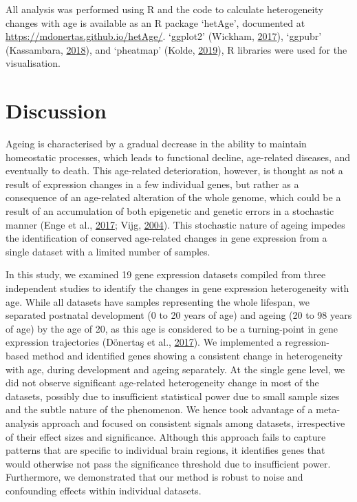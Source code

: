 \documentclass[12pt,twoside]{unicam}
\begin{document}
All analysis was performed using R and the code to calculate heterogeneity changes with age is available as an R package `hetAge', documented at \url{https://mdonertas.github.io/hetAge/}. `ggplot2' (Wickham, \protect\hyperlink{ref-Wickham2017}{2017}), `ggpubr' (Kassambara, \protect\hyperlink{ref-Kassambara2018}{2018}), and `pheatmap' (Kolde, \protect\hyperlink{ref-Kolde2019}{2019}), R libraries were used for the visualisation.

\hypertarget{discussion}{%
\section{Discussion}\label{discussion}}

Ageing is characterised by a gradual decrease in the ability to maintain homeostatic processes, which leads to functional decline, age-related diseases, and eventually to death. This age-related deterioration, however, is thought as not a result of expression changes in a few individual genes, but rather as a consequence of an age-related alteration of the whole genome, which could be a result of an accumulation of both epigenetic and genetic errors in a stochastic manner (Enge et al., \protect\hyperlink{ref-Enge2017}{2017}; Vijg, \protect\hyperlink{ref-Vijg2004}{2004}). This stochastic nature of ageing impedes the identification of conserved age-related changes in gene expression from a single dataset with a limited number of samples.

In this study, we examined 19 gene expression datasets compiled from three independent studies to identify the changes in gene expression heterogeneity with age. While all datasets have samples representing the whole lifespan, we separated postnatal development (0 to 20 years of age) and ageing (20 to 98 years of age) by the age of 20, as this age is considered to be a turning-point in gene expression trajectories (Dönertaş et al., \protect\hyperlink{ref-Donertas2017}{2017}). We implemented a regression-based method and identified genes showing a consistent change in heterogeneity with age, during development and ageing separately. At the single gene level, we did not observe significant age-related heterogeneity change in most of the datasets, possibly due to insufficient statistical power due to small sample sizes and the subtle nature of the phenomenon. We hence took advantage of a meta-analysis approach and focused on consistent signals among datasets, irrespective of their effect sizes and significance. Although this approach fails to capture patterns that are specific to individual brain regions, it identifies genes that would otherwise not pass the significance threshold due to insufficient power. Furthermore, we demonstrated that our method is robust to noise and confounding effects within individual datasets.
\end{document}
